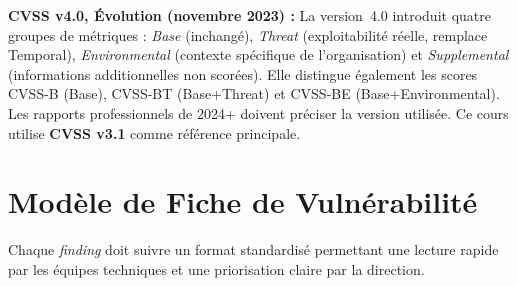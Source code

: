 \begin{boxinfo}
\textbf{CVSS v4.0, Évolution (novembre 2023) :}
La version~4.0 introduit quatre groupes de métriques : \textit{Base}
(inchangé), \textit{Threat} (exploitabilité réelle, remplace Temporal),
\textit{Environmental} (contexte spécifique de l'organisation) et
\textit{Supplemental} (informations additionnelles non scorées).
Elle distingue également les scores \og{}CVSS-B\fg{} (Base),
\og{}CVSS-BT\fg{} (Base+Threat) et \og{}CVSS-BE\fg{} (Base+Environmental).
Les rapports professionnels de 2024+ doivent préciser la version utilisée.
Ce cours utilise \textbf{CVSS v3.1} comme référence principale.
\end{boxinfo}

\section{Modèle de Fiche de Vulnérabilité}
\label{sec:fiche_vuln}

Chaque \textit{finding} doit suivre un format standardisé permettant une
lecture rapide par les équipes techniques et une priorisation claire par
la direction.


